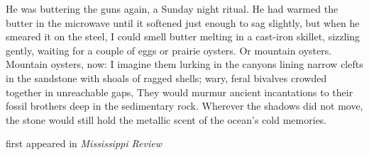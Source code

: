 He was buttering the guns again, a Sunday night ritual. He had warmed
the butter in the microwave until it softened just enough to sag
slightly, but when he smeared it on the steel, I could smell butter
melting in a cast-iron skillet, sizzling gently, waiting for a couple of
eggs or prairie oysters. Or mountain oysters. Mountain oysters, now: I
imagine them lurking in the canyons lining narrow clefts in the
sandstone with shoals of ragged shells; wary, feral bivalves crowded
together in unreachable gaps, They would murmur ancient incantations to
their fossil brothers deep in the sedimentary rock. Wherever the shadows
did not move, the stone would still hold the metallic scent of the
ocean's cold memories.

first appeared in \emph{Mississippi Review}
